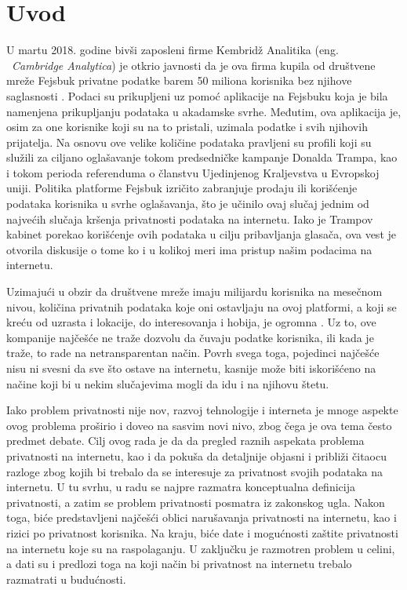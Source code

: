 \documentclass[a4paper]{article}
\begin{document}
\section{Uvod}
\label{sec:uvod}  
\par U martu 2018. godine bivši zaposleni firme Kembridž Analitika (eng.\\~{\em Cambridge Analytica}) je otkrio javnosti da je ova firma kupila od društvene mreže Fejsbuk privatne podatke barem 50 miliona korisnika bez njihove saglasnosti \cite{guardian}. Podaci su prikupljeni uz pomoć aplikacije na Fejsbuku koja je bila namenjena prikupljanju podataka u akadamske svrhe. Međutim, ova aplikacija je, osim za one korisnike koji su na to pristali, uzimala podatke i svih njihovih prijatelja. Na osnovu ove velike količine podataka pravljeni su profili koji su služili za ciljano oglašavanje tokom predsedničke kampanje Donalda Trampa, kao i tokom perioda referenduma o članstvu Ujedinjenog Kraljevstva u Evropskoj uniji. Politika platforme Fejsbuk izričito zabranjuje prodaju ili korišćenje podataka korisnika u svrhe oglašavanja, što je učinilo ovaj slučaj jednim od najvećih slučaja kršenja privatnosti podataka na internetu. Iako je Trampov kabinet porekao korišćenje ovih podataka u cilju pribavljanja glasača, ova vest je otvorila diskusije o tome ko i u kolikoj meri ima pristup našim podacima na internetu.
\par Uzimajući u obzir da društvene mreže imaju milijardu korisnika na mesečnom nivou, količina privatnih podataka koje oni ostavljaju na ovoj platformi, a koji se kreću od uzrasta i lokacije, do interesovanja i hobija, je ogromna \cite{instagram}. Uz to, ove kompanije najčešće ne traže dozvolu da čuvaju podatke korisnika, ili kada je traže, to rade na netransparentan način. Povrh svega toga, pojedinci najčešće nisu ni svesni da sve što ostave na internetu, kasnije može biti iskorišćeno na načine koji bi u nekim slučajevima mogli da idu i na njihovu štetu.
\par Iako problem privatnosti nije nov, razvoj tehnologije i interneta je mnoge aspekte ovog problema proširio i doveo na sasvim novi nivo, zbog čega je ova tema često predmet debate. Cilj ovog rada je da da pregled raznih aspekata problema privatnosti na internetu, kao i da pokuša da detaljnije objasni i približi čitaocu razloge zbog kojih bi trebalo da se interesuje za privatnost svojih podataka na internetu. U tu svrhu, u radu se najpre razmatra konceptualna definicija privatnosti, a zatim se problem privatnosti posmatra iz zakonskog ugla. Nakon toga, biće predstavljeni najčešći oblici narušavanja privatnosti na internetu, kao i rizici po privatnost korisnika. Na kraju, biće date i mogućnosti zaštite privatnosti na internetu koje su na raspolaganju. U zaključku je razmotren problem u celini, a dati su i predlozi toga na koji način bi privatnost na internetu trebalo razmatrati u budućnosti.
\end{document}
